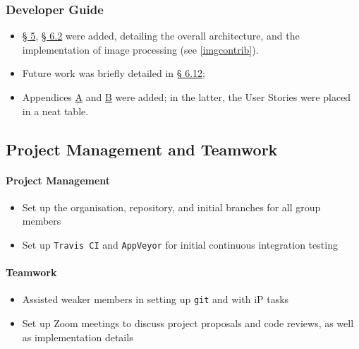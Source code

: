\documentclass[11pt,british]{article}
\begin{document}
\subsubsection{Developer Guide}
\begin{itemize}
	\item \href{https://ay1920s2-cs2103t-w12-4.github.io/main/DeveloperGuide.html#design}{\S{} 5}, \href{https://ay1920s2-cs2103t-w12-4.github.io/main/DeveloperGuide.html#image-management-done-by-sharadh-rajaraman}{\S{} 6.2} were added, detailing the overall architecture, and the implementation of image processing (see \cref{imgcontrib}).
	\item Future work was briefly detailed in \href{https://ay1920s2-cs2103t-w12-4.github.io/main/DeveloperGuide.html#Implementation-Future}{\S{} 6.12};
	\item Appendices \href{https://ay1920s2-cs2103t-w12-4.github.io/main/DeveloperGuide.html#product-scope-done-by-zain-alam-sharadh-rajaraman}{A} and \href{https://ay1920s2-cs2103t-w12-4.github.io/main/DeveloperGuide.html#user-stories-done-by-sharadh-rajaraman-and-adarsh-chugani}{B} were added; in the latter, the User Stories were placed in a neat table.
\end{itemize}

\subsection{Project Management and Teamwork}
\paragraph{Project Management}
\begin{itemize}
	\item Set up the organisation, repository, and initial branches for all group members 
	\item Set up \texttt{Travis CI} and \texttt{AppVeyor} for initial continuous integration testing
\end{itemize}

\paragraph{Teamwork}
\begin{itemize}
	\item Assisted weaker members in setting up \texttt{git} and with iP tasks
	\item Set up Zoom meetings to discuss project proposals and code reviews, as well as implementation details
\end{itemize}
\end{document}
